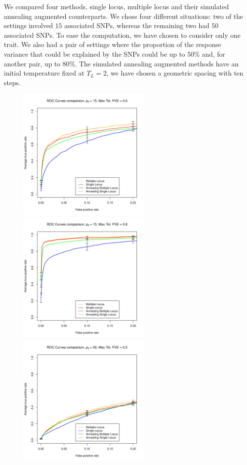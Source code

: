 \documentclass[a4paper, 11pt]{report}
\numberwithin{equation}{chapter}
\begin{document}
We compared four methods, single locus, multiple locus and their simulated annealing augmented counterparts. We chose four different situations: two of the settings involved $15$ associated SNPs, whereas the remaining two had $50$ associated SNPs. To ease the computation, we have chosen to consider only one trait. We also had a pair of settings where the proportion of the response variance that could be explained by the SNPs could be up to $50\%$ and, for another pair, up to $80\%$. The simulated annealing augmented methods have an initial temperature fixed at $T_L = 2$, we have chosen a geometric spacing with ten steps.

\begin{figure}[h!]
\includegraphics[width=2.6in, bb=0 0 500 500]{images/ROC_Comp_p0_15_var_0_5.pdf}
\includegraphics[width=2.6in, bb=0 0 500 500]{images/ROC_Comp_p0_15_var_0_8.pdf}
\includegraphics[width=2.6in, bb=0 0 500 500]{images/ROC_Comp_p0_50_var_0_5.pdf}

\end{figure}
\end{document}
